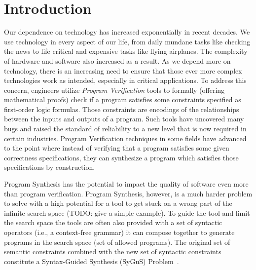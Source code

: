 \section{Introduction}
\label{sec:introduction}
Our dependence on technology has increased exponentially in recent decades.
%
We use technology in every aspect of our life, from daily mundane tasks like checking the news to life critical and expensive tasks like flying airplanes.
%
The complexity of hardware and software also increased as a result.
%
As we depend more on technology, there is an increasing need to ensure that those ever more complex technologies work as intended, especially in critical applications.
%
To address this concern, engineers utilize \emph{Program Verification} tools
%
to formally (offering mathematical proofs) check if a program satisfies some constraints specified as first-order logic formulas.
%
Those constraints are encodings of the relationships between the inputs and outputs of a program.
%
Such tools have uncovered many bugs and raised the standard of reliability to a new level that is now required in certain industries.
%
Program Verification techniques in some fields have advanced to the point where instead of verifying that a program satisfies some given correctness specifications,
%
they can synthesize a program which satisfies those specifications by construction.

Program Synthesis has the potential to impact the quality of software even more than program verification.
%
Program Synthesis, however, is a much harder problem to solve with a high potential for a tool to get stuck on a wrong part of the infinite search space (TODO: give a simple example).
%
To guide the tool and limit the search space the tools are often also provided with a set of syntactic operators (i.e., a context-free grammar) it can compose together to generate programs in the search space (set of allowed programs).
%
The original set of semantic constraints combined with the new set of syntactic constraints constitute a Syntax-Guided Synthesis (SyGuS) Problem~\cite{sygus:2013}.


